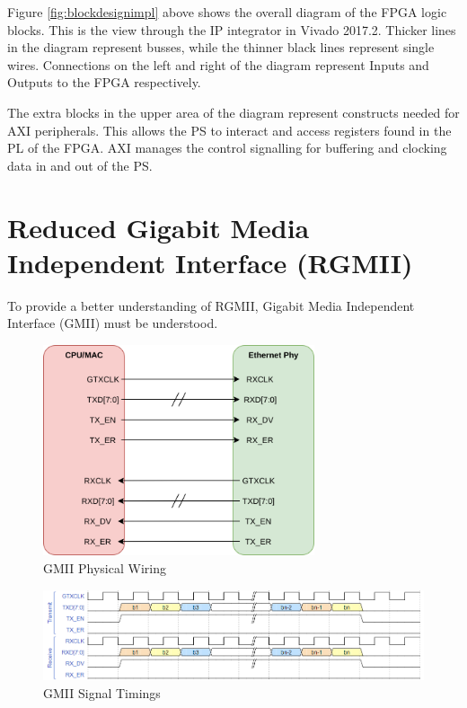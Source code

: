 \par Figure \ref{fig:blockdesignimpl} above shows the overall diagram of the FPGA logic blocks. This is the view 
through the IP integrator in Vivado 2017.2. Thicker lines in the diagram represent busses, while the thinner black 
lines represent single wires.  Connections on the left and right of the diagram represent Inputs and Outputs to the 
FPGA respectively. 

\par The extra blocks in the upper area of the diagram represent constructs needed for AXI peripherals. This allows 
the PS to interact and access registers found in the PL of the FPGA. AXI manages the control signalling for buffering 
and clocking data in and out of the PS.

\section{Reduced Gigabit Media Independent Interface (RGMII)}

\par To provide a better understanding of RGMII, Gigabit Media Independent Interface (GMII) must be understood. 

\begin{figure}[H]
    \begin{center}
        \includegraphics[keepaspectratio,width=8cm]{Images/GMIIWiring}
        \caption{GMII Physical Wiring}
        \label{fig:gmiiwiring}
    \end{center}
\end{figure}

\begin{figure}[H]
    \begin{center}
        \includegraphics[keepaspectratio,width=15cm]{Images/GMIISignaling}
        \caption{GMII Signal Timings}
        \label{fig:gmiisignals}
    \end{center}
\end{figure}

